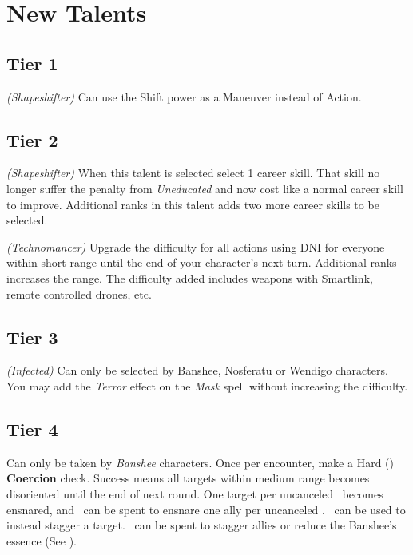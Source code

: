 \documentclass{book}
\begin{document}
\chapter{New Talents}
\begin{multicols}{2}
\section{Tier 1}
 \textit{(Shapeshifter)} Can use the Shift power as a Maneuver instead of Action.


\section{Tier 2}

 \textit{(Shapeshifter)} When this talent is selected select 1 career skill. That skill no longer suffer the penalty from \textit{Uneducated} and now cost like a normal career skill to improve. Additional ranks in this talent adds two more career skills to be selected.

 \textit{(Technomancer)} Upgrade the difficulty for all actions using DNI for everyone within short range until the end of your character's next turn. Additional ranks increases the range. The difficulty added includes weapons with Smartlink, remote controlled drones, etc.

\section{Tier 3}

 \textit{(Infected)} Can only be selected by Banshee, Nosferatu or Wendigo characters. You may add the \textit{Terror} effect on the \textit{Mask} spell without increasing the difficulty.



\section{Tier 4}
 Can only be taken by \textit{Banshee} characters. Once per encounter, make a Hard (\DifficultyDie \DifficultyDie \DifficultyDie) \textbf{Coercion} check. Success means all targets within medium range becomes disoriented until the end of next round. One target per uncanceled \Success\ becomes ensnared, and \Threat\ can be spent to ensnare one ally per uncanceled \Threat. \Triumph\ can be used to instead stagger a target. \Despair\ can be spent to stagger allies or reduce the Banshee's essence (See \pageref{sec:essenceloss}).


\end{multicols}
\end{document}
